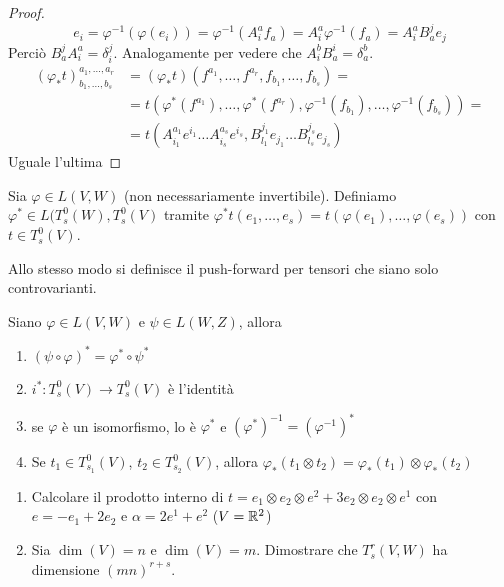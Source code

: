 \begin{proof}
	\begin{equation*}
		e_i = \varphi^{-1}(\varphi(e_i)) = \varphi^{-1}(A_i^af_a) = A_i^a\varphi^{-1}(f_a) = A_i^a B_a^j e_j
	\end{equation*}
	Perciò $B_a^jA_i^a = \delta_i^j$. Analogamente per vedere che $A_i^bB_a^i = \delta_a^b$.
	\begin{align*}
		(\varphi_*t)_{b_1,\dots,b_s}^{a_1,\dots,a_r} &= (\varphi_*t)(f^{a_1},\dots, f^{a_r},f_{b_1},\dots,f_{b_s}) =\\
		&= t(\varphi^*(f^{a_1}),\dots, \varphi^*(f^{a_r}),\varphi^{-1}(f_{b_1}),\dots,\varphi^{-1}(f_{b_s})) =\\
		&=t (A_{i_1}^{a_1} e^{i_1}\dots A_{i_s}^{a_s} e^{i_s},B_{l_1}^{j_1}e_{j_1}\dots B_{l_s}^{j_s}e_{j_s})
	\end{align*}
	Uguale l'ultima


\end{proof}

\begin{definition}
	Sia $\varphi\in L(V,W)$ (non necessariamente invertibile). Definiamo $\varphi^*\in L(T_s^0(W),T_s^0(V)$ tramite $\varphi^*t(e_1,\dots,e_s) = t(\varphi(e_1),\dots,\varphi(e_s))$ con $t\in T_s^0(V)$.
	
	Allo stesso modo si definisce il push-forward per tensori che siano solo controvarianti.
\end{definition}

\begin{proposition}
	Siano $\varphi\in L(V,W)$ e $\psi\in L(W,Z)$, allora
	\begin{enumerate}
		\item $(\psi\circ\varphi)^*=\varphi^*\circ\psi^*$
		\item $i^*:T_s^0(V) \to T_s^0(V)$ è l'identità
		\item se $\varphi$ è un isomorfismo, lo è $\varphi^*$ e $(\varphi^*)^{-1} = (\varphi^{-1})^*$
		\item Se $t_1\in T_{s_1}^0(V)$, $t_2\in T_{s_2}^0(V)$, allora $\varphi_*(t_1\otimes t_2) = \varphi_*(t_1)\otimes \varphi_*(t_2)$
	\end{enumerate}
\end{proposition}

\begin{exercise}
	\begin{enumerate}
		\item Calcolare il prodotto interno di $t=e_1\otimes e_2\otimes e^2+3e_2\otimes e_2\otimes e^1$ con $e = -e_1+2e_2$ e $\alpha = 2e^1+e^2$ ($V=\mathbb R^2$)
		\item Sia $\dim(V) = n$ e $\dim(V) = m$. Dimostrare che $T_s^r(V,W)$ ha dimensione $(mn)^{r+s}$. %
	\end{enumerate}
\end{exercise}

